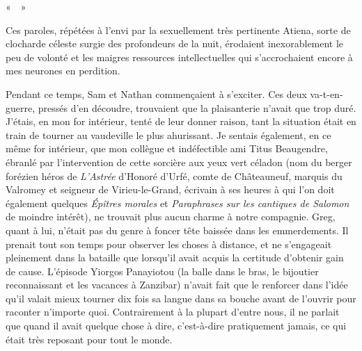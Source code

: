 «~~»

Ces paroles, répétées à l’envi par la sexuellement très pertinente Atiena, sorte de clocharde céleste surgie des profondeurs de la nuit, érodaient inexorablement le peu de volonté et les maigres ressources intellectuelles qui s’accrochaient encore à mes neurones en perdition.

%
%
%
Pendant ce temps, Sam et Nathan commençaient à s’exciter. Ces deux va-t-en-guerre, pressés d’en découdre, trouvaient que la plaisanterie n’avait que trop duré. J’étais, en mon for intérieur, tenté de leur donner raison, tant la situation était en train de tourner au vaudeville le plus ahurissant. Je sentais également, en ce même for intérieur, que mon collègue et indéfectible ami Titus Beaugendre, ébranlé par l’intervention de cette sorcière aux yeux vert céladon (nom du berger forézien héros de \textit{L’Astrée} d’Honoré d’Urfé, comte de Châteauneuf, marquis du Valromey et seigneur de Virieu-le-Grand, écrivain à ses heures à qui l’on doit également quelques \textit{Épîtres morales} et \textit{Paraphrases sur les cantiques de Salomon} de moindre intérêt), ne trouvait plus aucun charme à notre compagnie. Greg, quant à lui, n’était pas du genre à foncer tête baissée dans les emmerdements. Il prenait tout son temps pour observer les choses à distance, et ne s’engageait pleinement dans la bataille que lorsqu’il avait acquis la certitude d’obtenir gain de cause. L’épisode Yiorgos Panayiotou (la balle dans le bras, le bijoutier reconnaissant et les vacances à Zanzibar) n’avait fait que le renforcer dans l’idée qu’il valait mieux tourner dix fois sa langue dans sa bouche avant de l’ouvrir pour raconter n’importe quoi. Contrairement à la plupart d’entre nous, il ne parlait que quand il avait quelque chose à dire, c’est-à-dire pratiquement jamais, ce qui était très reposant pour tout le monde.

